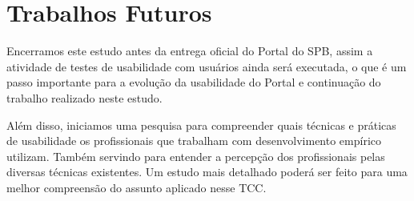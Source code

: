 \section{Trabalhos Futuros}

Encerramos este estudo antes da entrega oficial do Portal do SPB, assim a atividade de testes de usabilidade com usuários ainda será executada, o que é um passo importante para a evolução da usabilidade do Portal e continuação do trabalho realizado neste estudo.

Além disso, iniciamos uma pesquisa para compreender quais técnicas e práticas de usabilidade os profissionais que trabalham com desenvolvimento empírico utilizam. Também servindo para entender a percepção dos profissionais pelas diversas técnicas existentes. Um estudo mais detalhado poderá ser feito para uma melhor compreensão do assunto aplicado nesse TCC. 

